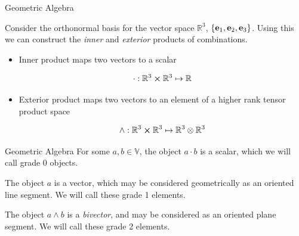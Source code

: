 \documentclass{beamer}
\begin{document}
\begin{frame}{Geometric Algebra}

Consider the orthonormal basis for the vector space $\mathbb{R}^3$, $\{\vb e_1, \vb e_2, \vb e_3\}$. Using this we can construct the \emph{inner} and \emph{exterior} products of combinations.

\pause

\begin{itemize}
	\item {} Inner product maps two vectors to a scalar
	
	\begin{equation}
		\cdot : \mathbb{R}^3 \cross \mathbb{R}^3 \mapsto \mathbb{R}
	\end{equation}

	\pause
	\item {} Exterior product maps two vectors to an element of a higher rank tensor product space
	
	\begin{equation}
		\wedge : \mathbb{R}^3 \cross \mathbb{R}^3 \mapsto \mathbb{R}^3 \otimes \mathbb{R}^3
	\end{equation}
\end{itemize}
\end{frame}


\begin{frame}{Geometric Algebra}
For some $a, b \in \mathbb{V}$, the object $a \cdot b$ is a scalar, which we will call grade 0 objects.
\pause

The object $a$ is a vector, which may be considered geometrically as an oriented line segment. We will call these grade 1 elements.
\pause

The object $a \wedge b$ is a \emph{bivector}, and may be considered as an oriented plane segment. We will call these grade 2 elements.
\end{frame}
\end{document}
